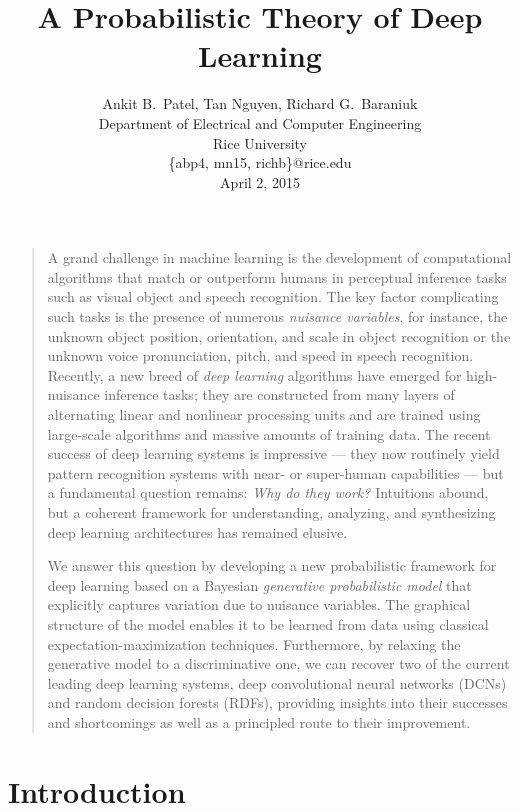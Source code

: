 \documentclass[12pt]{article}
\title{\bf A Probabilistic Theory of Deep Learning}
\author{Ankit B.\ Patel, %
Tan Nguyen, Richard G.\ Baraniuk \\[4mm]
\normalsize{Department of Electrical and Computer Engineering} \\
\normalsize{Rice University} \\
\normalsize{\{abp4, mn15, richb\}@rice.edu} \\
\normalsize{April 2, 2015}
}
\date{}
\newenvironment{sciabstract}{%
\begin{quote} \bf}{\end{quote}}
\begin{document}
 

\baselineskip16pt

\maketitle 

\begin{sciabstract}

A grand challenge in machine learning is the development of computational algorithms that match or outperform humans in perceptual inference tasks such as visual object and speech recognition.  
The key factor complicating such tasks is the presence of numerous {\em nuisance variables}, for instance, the unknown object position, orientation, and scale in object recognition or the unknown voice pronunciation, pitch, and speed in speech recognition.
Recently, a new breed of {\em deep learning} algorithms have emerged for high-nuisance inference tasks; they are constructed from many layers of alternating linear and nonlinear processing units and are trained using large-scale algorithms and massive amounts of training data. 
The recent success of deep learning systems is impressive --- they now routinely yield pattern recognition systems with near- or super-human capabilities --- but a fundamental question remains: {\em Why do they work?}
Intuitions abound, but a coherent framework for understanding, analyzing, and synthesizing deep learning architectures has remained elusive.

We answer this question by developing a new probabilistic framework for deep learning based on a Bayesian {\em generative probabilistic model} that explicitly captures variation due to nuisance variables.  
The graphical structure of the model enables it to be learned from data using classical expectation-maximization techniques.
Furthermore, by relaxing the generative model to a discriminative one, we can recover two of the
current leading deep learning systems, deep convolutional neural networks (DCNs) and random decision forests (RDFs),
providing insights into their successes and shortcomings as well as a principled route to their improvement. 
\end{sciabstract}

\newpage
\tableofcontents
\newpage

\section{Introduction}
\end{document}
